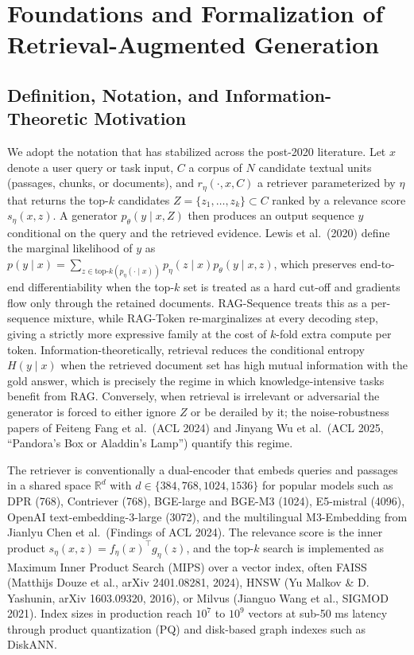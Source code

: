 \documentclass{article}
\begin{document}
\section{Foundations and Formalization of Retrieval-Augmented Generation}\label{foundations-and-formalization-of-retrieval-augmented-generation}

\subsection{Definition, Notation, and Information-Theoretic Motivation}\label{definition-notation-and-information-theoretic-motivation}

We adopt the notation that has stabilized across the post-2020 literature. Let \(x\) denote a user query or task input, \(C\) a corpus of \(N\) candidate textual units (passages, chunks, or documents), and \(r_\eta(\cdot, x, C)\) a retriever parameterized by \(\eta\) that returns the top-\(k\) candidates \(Z = \{z_1, \dots, z_k\} \subset C\) ranked by a relevance score \(s_\eta(x, z)\). A generator \(p_\theta(y \mid x, Z)\) then produces an output sequence \(y\) conditional on the query and the retrieved evidence. Lewis et al.~(2020) define the marginal likelihood of \(y\) as \(p(y \mid x) = \sum_{z \in \text{top-}k(p_\eta(\cdot \mid x))} p_\eta(z \mid x) p_\theta(y \mid x, z)\), which preserves end-to-end differentiability when the top-\(k\) set is treated as a hard cut-off and gradients flow only through the retained documents. RAG-Sequence treats this as a per-sequence mixture, while RAG-Token re-marginalizes at every decoding step, giving a strictly more expressive family at the cost of \(k\)-fold extra compute per token. Information-theoretically, retrieval reduces the conditional entropy \(H(y \mid x)\) when the retrieved document set has high mutual information with the gold answer, which is precisely the regime in which knowledge-intensive tasks benefit from RAG. Conversely, when retrieval is irrelevant or adversarial the generator is forced to either ignore \(Z\) or be derailed by it; the noise-robustness papers of Feiteng Fang et al.~(ACL 2024) and Jinyang Wu et al.~(ACL 2025, ``Pandora's Box or Aladdin's Lamp'') quantify this regime.

The retriever is conventionally a dual-encoder that embeds queries and passages in a shared space \(\mathbb{R}^d\) with \(d \in \{384, 768, 1024, 1536\}\) for popular models such as DPR (768), Contriever (768), BGE-large and BGE-M3 (1024), E5-mistral (4096), OpenAI text-embedding-3-large (3072), and the multilingual M3-Embedding from Jianlyu Chen et al.~(Findings of ACL 2024). The relevance score is the inner product \(s_\eta(x, z) = f_\eta(x)^\top g_\eta(z)\), and the top-\(k\) search is implemented as Maximum Inner Product Search (MIPS) over a vector index, often FAISS (Matthijs Douze et al., arXiv 2401.08281, 2024), HNSW (Yu Malkov \& D. Yashunin, arXiv 1603.09320, 2016), or Milvus (Jianguo Wang et al., SIGMOD 2021). Index sizes in production reach \(10^7\) to \(10^9\) vectors at sub-50 ms latency through product quantization (PQ) and disk-based graph indexes such as DiskANN.
\end{document}
